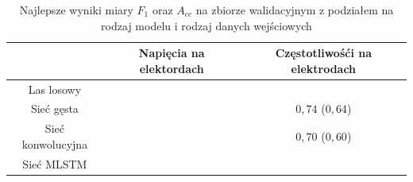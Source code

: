 \documentclass{./assets/wfis}
\begin{document}

\begin{table}[h]
    \centering
    \begin{tabular}{|c|c|c|}
        \hline
                 & Napięcia na elektordach & Częstotliwośći na elektrodach  \\
        \hline
        Las losowy &  &  \\
        Sieć gęsta &  & $0,74$ ($0,64$) \\
        Sieć konwolucyjna & & $0,70$ ($0,60$) \\
        Sieć MLSTM & & \\
        \hline
    \end{tabular}
    \caption{Najlepsze wyniki miary $F_1$ oraz $A_{cc}$ na zbiorze walidacyjnym z podziałem na rodzaj modelu i rodzaj danych wejściowych}
    \label{tab:high-level-results}
\end{table}
\end{document}

